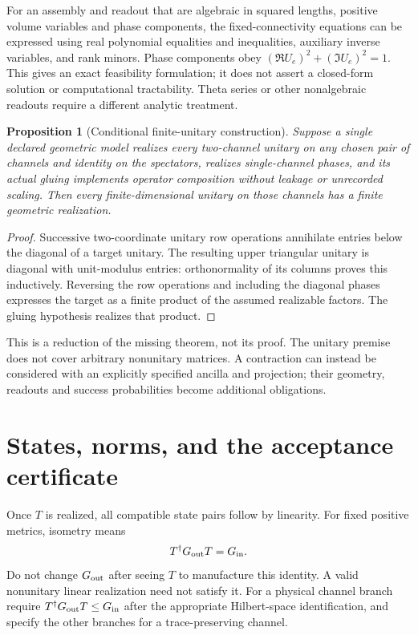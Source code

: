 \documentclass[11pt]{article}
\newtheorem{proposition}[theorem]{Proposition}
\theoremstyle{definition}
\begin{document}
For an assembly and readout that are algebraic in squared lengths,
positive volume variables and phase components, the fixed-connectivity
equations can be expressed using real polynomial equalities and
inequalities, auxiliary inverse variables, and rank minors.
Phase components obey $(\Re U_e)^2+(\Im U_e)^2=1$.
This gives an exact feasibility formulation; it does not assert
a closed-form solution or computational tractability.
Theta series or other nonalgebraic readouts require a different
analytic treatment.

\begin{proposition}[Conditional finite-unitary construction]\label{prop:conditional}
Suppose a single declared geometric model realizes every two-channel
unitary on any chosen pair of channels and identity on the spectators,
realizes single-channel phases, and its actual gluing implements
operator composition without leakage or unrecorded scaling.
Then every finite-dimensional unitary on those channels has a finite
geometric realization.
\end{proposition}
\begin{proof}
Successive two-coordinate unitary row operations annihilate entries
below the diagonal of a target unitary. The resulting upper triangular
unitary is diagonal with unit-modulus entries: orthonormality of its
columns proves this inductively. Reversing the row operations and
including the diagonal phases expresses the target as a finite product
of the assumed realizable factors. The gluing hypothesis realizes that
product.
\end{proof}
This is a reduction of the missing theorem, not its proof.
The unitary premise does not cover arbitrary nonunitary matrices.
A contraction can instead be considered with an explicitly specified
ancilla and projection; their geometry, readouts and success
probabilities become additional obligations.

\section{States, norms, and the acceptance certificate}\label{sec:accept}
Once $T$ is realized, all compatible state pairs follow by linearity.
For fixed positive metrics, isometry means
\begin{equation}\label{eq:norm}
 T^\dagger G_{\rm out}T=G_{\rm in}.
\end{equation}
Do not change $G_{\rm out}$ after seeing $T$ to manufacture this identity.
A valid nonunitary linear realization need not satisfy it.
For a physical channel branch require
$T^\dagger G_{\rm out}T\le G_{\rm in}$ after the appropriate
Hilbert-space identification, and specify the other branches for a
trace-preserving channel.
\end{document}
